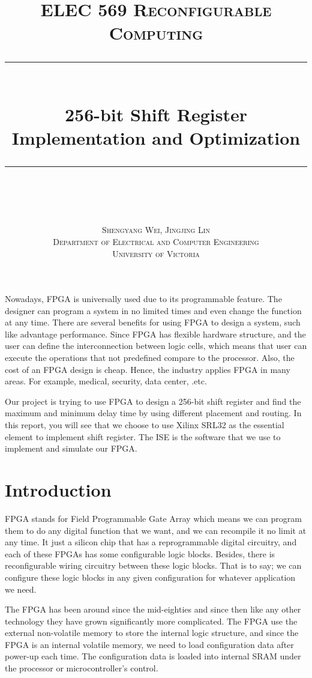 \documentclass[12pt]{article}
\title{ \normalsize \scshape{ELEC 569 Reconfigurable Computing}
	\\[2.0cm]
	\rule{\linewidth}{2pt}\\
	\LARGE \textbf{{256-bit Shift Register Implementation and Optimization}}
	\rule{\linewidth}{2pt} \\[0.5cm]
	\normalsize \vspace*{5 \baselineskip}}
\date{}
\author{
	\Large{ \scshape{Shengyang Wei, Jingjing Lin}}\\
	\normalsize
	\vspace{0.5cm}
	\scshape{Department of Electrical and Computer Engineering}\\
	\scshape{University of Victoria}\\}
\begin{document}
\maketitle

\newpage
\doublespacing
\begin{abstract}
	 
\end{abstract}
Nowadays, FPGA is universally used due to its programmable feature. The designer can program a system in no limited times and even change the function at any time. There are several benefits for using FPGA to design a system, such like advantage performance. Since FPGA has flexible hardware structure, and the user can define the interconnection between logic cells, which means that user can execute the operations that not predefined compare to the processor\cite{benifit}. Also, the cost of an FPGA design is cheap. Hence, the industry applies FPGA in many areas. For example, medical, security, data center, .etc\cite{applications}.

Our project is trying to use FPGA to design a 256-bit shift register and find the maximum and minimum delay time by using different placement and routing. In this report, you will see that we choose to use Xilinx SRL32 as the essential element to implement shift register. The ISE is the software that we use to implement and simulate our FPGA.
\newpage
 
\tableofcontents

\newpage

\section{Introduction}
FPGA stands for Field Programmable Gate Array which means we can program them to do any digital function that we want, and we can recompile it no limit at any time. It just a silicon chip that has a reprogrammable digital circuitry, and each of these FPGAs has some configurable logic blocks. Besides, there is reconfigurable wiring circuitry between these logic blocks. That is to say; we can configure these logic blocks in any given configuration for whatever application we need.

The FPGA has been around since the mid-eighties and since then like any other technology they have grown significantly more complicated. The FPGA use the external non-volatile memory to store the internal logic structure, and since the FPGA is an internal volatile memory, we need to load configuration data after power-up each time. The configuration data is loaded into internal SRAM under the processor or microcontroller's control\cite{7series}.
\end{document}
